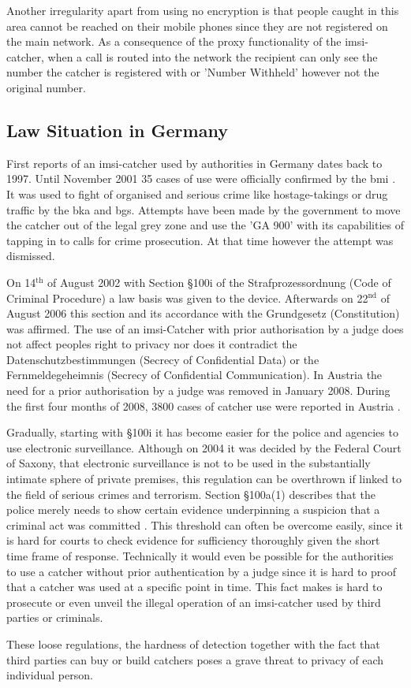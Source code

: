 Another irregularity apart from using no encryption is that people caught in this area cannot be reached on their mobile phones since they are not registered on the main network.
As a consequence of the proxy functionality of the \gls{imsi}-catcher, when a call is routed into the network the recipient can only see the number the catcher is registered with or 'Number Withheld' however not the original number.

\subsection{Law Situation in Germany}
\label{sec:catcher_law}

First reports of an \gls{imsi}-catcher used by authorities in Germany dates back to 1997.
Until November 2001 35 cases of use were officially confirmed by the \gls{bmi} \cite{fox}.
It was used to fight of organised and serious crime like hostage-takings or drug traffic by the \gls{bka} and \gls{bgs}.
Attempts have been made by the government to move the catcher out of the legal grey zone and use the 'GA 900' with its capabilities of tapping in to calls for crime prosecution.
At that time however the attempt was dismissed.

On 14$^\text{th}$ of August 2002 with Section §100i of the Strafprozessordnung (Code of Criminal Procedure) a law basis was given to the device.
Afterwards on 22$^\text{nd}$ of August 2006 this section and its accordance with the Grundgesetz (Constitution) was affirmed.
The use of an \gls{imsi}-Catcher with prior authorisation by a judge does not affect peoples right to privacy nor does it contradict the Datenschutzbestimmungen (Secrecy of Confidential Data) or the Fernmeldegeheimnis (Secrecy of Confidential Communication).
In Austria the need for a prior authorisation by a judge was removed in January 2008.
During the first four months of 2008, 3800 cases of catcher use were reported in Austria \cite{imsi_wiki}.

Gradually, starting with §100i it has become easier for the police and agencies to use electronic surveillance.
Although on 2004 it was decided by the Federal Court of Saxony, that electronic surveillance is not to be used in the substantially intimate sphere of private premises, this regulation can be overthrown if linked to the field of serious crimes and terrorism.
Section §100a(1) describes that the police merely needs to show certain evidence underpinning a suspicion that a criminal act was committed \cite{criminal_justice}.
This threshold can often be overcome easily, since it is hard for courts to check evidence for sufficiency thoroughly given the short time frame of response.
Technically it would even be possible for the authorities to use a catcher without prior authentication by a judge since it is hard to proof that a catcher was used at a specific point in time.
This fact makes is hard to prosecute or even unveil the illegal operation of an \gls{imsi}-catcher used by third parties or criminals.

These loose regulations, the hardness of detection together with the fact that third parties  can buy or build catchers poses a grave threat to privacy of each individual person.